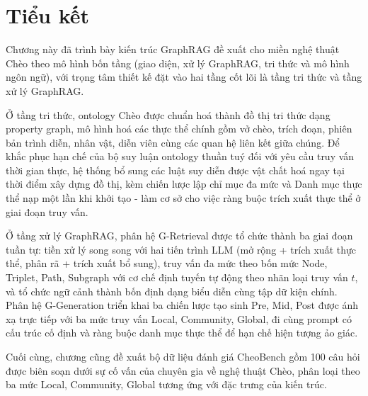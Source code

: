 
\section*{Tiểu kết}

Chương này đã trình bày kiến trúc GraphRAG đề xuất cho miền nghệ thuật Chèo theo mô hình bốn tầng (giao diện, xử lý GraphRAG, tri thức và mô hình ngôn ngữ), với trọng tâm thiết kế đặt vào hai tầng cốt lõi là tầng tri thức và tầng xử lý GraphRAG.

Ở tầng tri thức, ontology Chèo được chuẩn hoá thành đồ thị tri thức dạng property graph, mô hình hoá các thực thể chính gồm vở chèo, trích đoạn, phiên bản trình diễn, nhân vật, diễn viên cùng các quan hệ liên kết giữa chúng. Để khắc phục hạn chế của bộ suy luận ontology thuần tuý đối với yêu cầu truy vấn thời gian thực, hệ thống bổ sung các luật suy diễn được vật chất hoá ngay tại thời điểm xây dựng đồ thị, kèm chiến lược lập chỉ mục đa mức và Danh mục thực thể nạp một lần khi khởi tạo - làm cơ sở cho việc ràng buộc trích xuất thực thể ở giai đoạn truy vấn.

Ở tầng xử lý GraphRAG, phân hệ G-Retrieval được tổ chức thành ba giai đoạn tuần tự: tiền xử lý song song với hai tiến trình LLM (mở rộng + trích xuất thực thể, phân rã + trích xuất bổ sung), truy vấn đa mức theo bốn mức Node, Triplet, Path, Subgraph với cơ chế định tuyến tự động theo nhãn loại truy vấn $t$, và tổ chức ngữ cảnh thành bốn định dạng biểu diễn cùng tập dữ kiện chính. Phân hệ G-Generation triển khai ba chiến lược tạo sinh Pre, Mid, Post được ánh xạ trực tiếp với ba mức truy vấn Local, Community, Global, đi cùng prompt có cấu trúc cố định và ràng buộc danh mục thực thể để hạn chế hiện tượng ảo giác.

Cuối cùng, chương cũng đề xuất bộ dữ liệu đánh giá CheoBench gồm 100 câu hỏi được biên soạn dưới sự cố vấn của chuyên gia về nghệ thuật Chèo, phân loại theo ba mức Local, Community, Global tương ứng với đặc trưng của kiến trúc.
